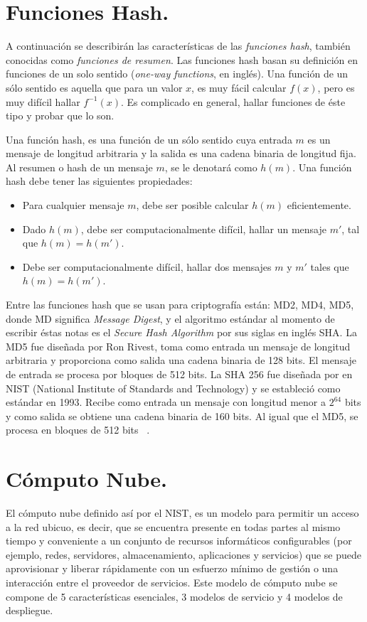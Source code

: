 \section{Funciones Hash. }
A continuaci\'on se describir\'an las caracter\'isticas de las {\it funciones hash}, tambi\'en conocidas como {\it funciones de resumen}. Las funciones hash basan su definici\'on en funciones de un solo sentido  ({\it one-way functions}, en ingl\'es). Una funci\'on de un s\'olo sentido es aquella que para un valor $x$, es  muy f\'acil calcular $f(x)$, pero es muy dif\'icil hallar $f^{-1}(x)$. Es complicado en general, hallar funciones de \'este tipo y probar que lo son.
\begin{definition}
Una funci\'on hash, es una funci\'on de un s\'olo sentido cuya entrada $m$  es un mensaje de longitud arbitraria y la salida es una cadena binaria de longitud fija. Al resumen o hash de un mensaje $m$, se le denotar\'a como $h(m)$. Una funci\'on hash debe
tener las siguientes propiedades:
\begin{itemize}
	\item Para cualquier mensaje $m$, debe ser posible calcular $h(m)$ eficientemente. 
	\item Dado $h(m)$, debe ser computacionalmente dif\'icil, hallar un mensaje $m'$, tal que $h(m)=h(m')$.
	\item Debe ser computacionalmente dif\'icil, hallar dos mensajes $m$ y $m'$ tales que $h(m)=h(m')$.
\end{itemize}
\end{definition}
 
Entre las funciones hash que se usan para criptograf\'ia est\'an: MD2, MD4, MD5, donde MD significa {\it Message Digest}, y el algoritmo est\'andar al momento de escribir \'estas notas es el {\it Secure Hash Algorithm} por sus siglas en ingl\'es SHA.
  La MD5 fue dise\~nada por Ron Rivest, toma como entrada un mensaje de longitud arbitraria y proporciona como salida una cadena binaria de 128 bits.
El mensaje de entrada se procesa por bloques de 512 bits.  La SHA 256 fue dise\~nada por en NIST (National Institute of Standards and Technology) y se estableci\'o como est\'andar en 1993. Recibe como entrada un mensaje con longitud menor a $2^{64}$ bits y
como salida se obtiene una cadena binaria de 160 bits. Al igual que el MD5, se procesa en bloques de 512 bits ~\cite{modes}.


\section{Cómputo Nube. }
El cómputo nube definido así por el NIST, es un modelo para permitir un acceso a la red ubicuo, es decir, que se encuentra presente en todas partes al mismo tiempo y conveniente a un conjunto de recursos informáticos configurables (por ejemplo, redes, servidores, almacenamiento, aplicaciones y servicios) que se puede aprovisionar y liberar rápidamente con un esfuerzo mínimo de gestión o una interacción entre el proveedor de servicios.
Este modelo de cómputo nube se compone de 5 características esenciales, 3 modelos de servicio y 4  modelos de despliegue. \\ \\  


